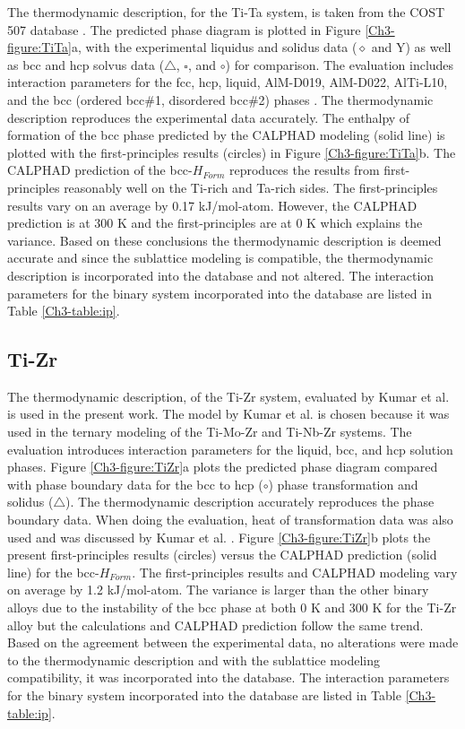 The thermodynamic description, for the Ti-Ta system, is taken from the COST 507 database \cite{Ansara1998}. The predicted phase diagram is plotted in Figure \ref{Ch3-figure:TiTa}a, with the experimental liquidus and solidus data ($\diamond$ and Y) as well as bcc and hcp solvus data ($\bigtriangleup$, $\square$, and $\circ$) for comparison. The evaluation includes interaction parameters for the fcc, hcp, liquid, AlM-D019, AlM-D022, AlTi-L10, and the bcc (ordered bcc\#1, disordered bcc\#2) phases \cite{Murray1987}. The thermodynamic description reproduces the experimental data accurately. The enthalpy of formation of the bcc phase predicted by the CALPHAD modeling (solid line) is plotted with the first-principles results (circles) in Figure \ref{Ch3-figure:TiTa}b. The CALPHAD prediction of the bcc-$H_{Form}$ reproduces the results from first-principles reasonably well on the Ti-rich and Ta-rich sides. The first-principles results vary on an average by 0.17 kJ/mol-atom. However, the CALPHAD prediction is at 300 K and the first-principles are at 0 K which explains the variance. Based on these conclusions the thermodynamic description is deemed accurate and since the sublattice modeling is compatible, the thermodynamic description is incorporated into the database and not altered. The interaction parameters for the binary system incorporated into the database are listed in Table \ref{Ch3-table:ip}.

\subsection{Ti-Zr}

The thermodynamic description, of the Ti-Zr system, evaluated by Kumar et al. \cite{Kumar1994a} is used in the present work. The model by Kumar et al. \cite{Kumar1994a} is chosen because it was used in the ternary modeling of the Ti-Mo-Zr and Ti-Nb-Zr systems. The evaluation introduces interaction parameters for the liquid, bcc, and hcp solution phases. Figure \ref{Ch3-figure:TiZr}a plots the predicted phase diagram compared with phase boundary data for the bcc to hcp ($\circ$) phase transformation and solidus ($\bigtriangleup$). The thermodynamic description accurately reproduces the phase boundary data. When doing the evaluation, heat of transformation data was also used and was discussed by Kumar et al. \cite{Kumar1994a}. Figure \ref{Ch3-figure:TiZr}b plots the present first-principles results (circles) versus the CALPHAD prediction (solid line) for the bcc-$H_{Form}$. The first-principles results and CALPHAD modeling vary on average by 1.2 kJ/mol-atom. The variance is larger than the other binary alloys due to the instability of the bcc phase at both 0 K and 300 K for the Ti-Zr alloy but the calculations and CALPHAD prediction follow the same trend. Based on the agreement between the experimental data, no alterations were made to the thermodynamic description and with the sublattice modeling compatibility, it was incorporated into the database. The interaction parameters for the binary system incorporated into the database are listed in Table \ref{Ch3-table:ip}. 

